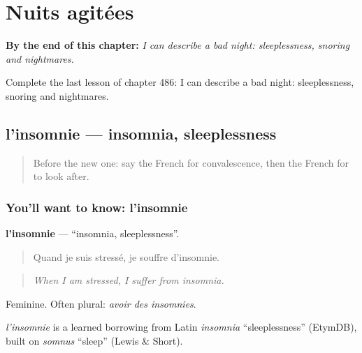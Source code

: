
\chapter{Nuits agitées}
\label{ch:fr-nuits-agitees}

\begin{chapteropening}
\textbf{By the end of this chapter:} \emph{I can describe a bad night: sleeplessness, snoring and nightmares.}

Complete the last lesson of chapter 486: I can describe a bad night: sleeplessness, snoring and nightmares.
\end{chapteropening}

\section[l'insomnie]{l'insomnie — insomnia, sleeplessness}

\label{lesson:FR-C486-insomnie}



\begin{quote}
Before the new one: say the French for convalescence, then the French for to look after.
\end{quote}

\subsection*{You'll want to know: l'insomnie}
\textbf{l'insomnie} — \textquotedblleft{}insomnia, sleeplessness\textquotedblright{}.

\begin{quote}
Quand je suis stressé, je souffre d'insomnie.
\end{quote}

\begin{quote}
\emph{When I am stressed, I suffer from insomnia.}
\end{quote}

Feminine. Often plural: \emph{avoir des insomnies}.

\begin{cousinweb}
\emph{l'insomnie} is a learned borrowing from Latin \emph{insomnia} \textquotedblleft{}sleeplessness\textquotedblright{} (EtymDB), built on \emph{somnus} \textquotedblleft{}sleep\textquotedblright{} (Lewis \& Short).
\end{cousinweb}

